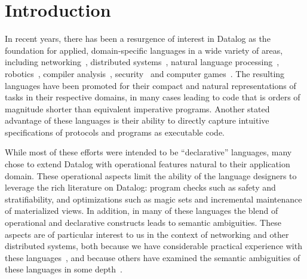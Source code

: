 \section{Introduction}




In recent years, there has been a resurgence of interest in Datalog as
the foundation for applied, domain-specific languages in a wide
variety of areas, including networking~\cite{Loo2009-CACM},
distributed systems~\cite{boom-eurosys,Belaramani:2009,Chu:2007}, natural language
processing~\cite{Eisner:2004}, robotics~\cite{Ashley-Rollman:2007},
compiler analysis~\cite{Lam:2005}, security~\cite{sd3,Li:2003,Zhou:2009}
and computer games~\cite{White:2007}.  The resulting languages have
been promoted for their compact and natural representations of tasks
in their respective domains, in many cases leading to code that is
orders of magnitude shorter than equivalent imperative programs.
Another stated advantage of these languages is their ability to
directly capture intuitive specifications of protocols and programs as
executable code.

While most of these efforts were intended to be ``declarative''
languages, many chose to extend Datalog with operational features
natural to their application domain.  These operational aspects
limit the ability of the language designers to
leverage the rich literature on Datalog: program checks such as safety
and stratifiability, and optimizations such as magic sets and
incremental maintenance of materialized views.  In addition, in many of
these languages the blend of operational and declarative constructs
leads to semantic ambiguities.  These aspects are of particular interest to us
in the context of networking and other distributed systems, both
because we have considerable practical experience with these
languages~\cite{boom-eurosys,Loo2009-CACM}, and because others have
examined the semantic ambiguities of these languages in some
depth~\cite{Mao2009,navarro}.

